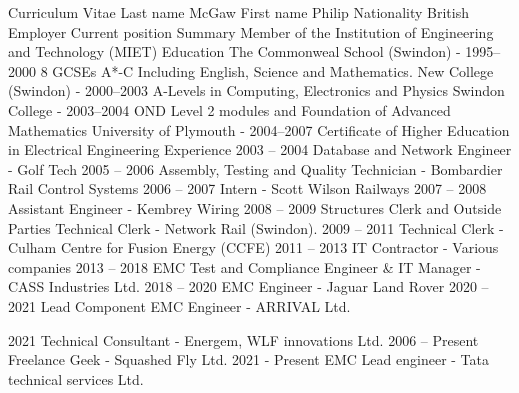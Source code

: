 Curriculum Vitae    
Last name    McGaw
First name    Philip
Nationality     British
Employer    
Current position    
Summary    Member of the Institution of Engineering and Technology (MIET)
Education
The Commonweal School (Swindon) - 1995–2000
8 GCSEs A*-C Including English, Science and Mathematics.
New College (Swindon) - 2000–2003
A-Levels in Computing, Electronics and Physics
Swindon College - 2003–2004
OND Level 2 modules and Foundation of Advanced Mathematics
University of Plymouth - 2004–2007
Certificate of Higher Education in Electrical Engineering
Experience
2003 – 2004     Database and Network Engineer - Golf Tech
2005 – 2006    Assembly, Testing and Quality Technician - Bombardier Rail Control Systems 
2006 – 2007    Intern - Scott Wilson Railways
2007 – 2008    Assistant Engineer - Kembrey Wiring
2008 – 2009    Structures Clerk and Outside Parties Technical Clerk - Network Rail (Swindon).
2009 – 2011    Technical Clerk - Culham Centre for Fusion Energy (CCFE)
2011 – 2013    IT Contractor - Various companies
2013 – 2018    EMC Test and Compliance Engineer & IT Manager - CASS Industries Ltd.
2018 – 2020    EMC Engineer - Jaguar Land Rover 
2020 – 2021    Lead Component EMC Engineer - ARRIVAL Ltd.

2021    Technical Consultant - Energem, WLF innovations Ltd.
2006 – Present    Freelance Geek - Squashed Fly Ltd. 
2021 -  Present EMC Lead engineer - Tata technical services Ltd. 

